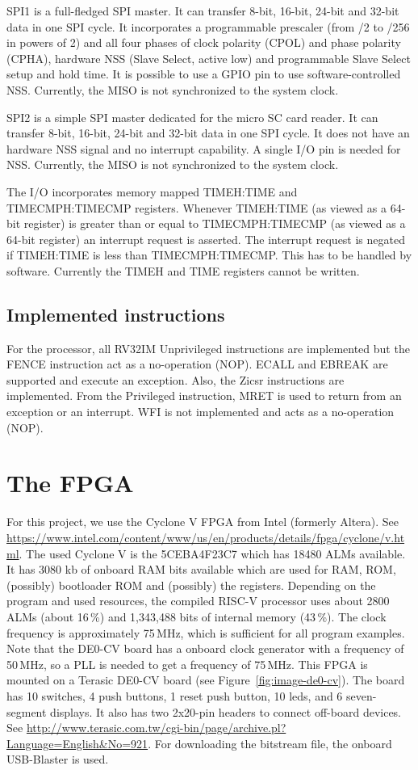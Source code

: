 \documentclass[12pt]{article}
\begin{document}
SPI1 is a full-fledged SPI master. It can transfer 8-bit, 16-bit, 24-bit and 32-bit data in one SPI cycle. It incorporates a programmable prescaler (from /2 to /256 in powers of 2) and all four phases of clock polarity (CPOL) and phase polarity (CPHA), hardware NSS (Slave Select, active low) and programmable Slave Select setup and hold time. It is possible to use a GPIO pin to use software-controlled NSS. Currently, the MISO is not synchronized to the system clock.

SPI2 is a simple SPI master dedicated for the micro SC card reader. It can transfer 8-bit, 16-bit, 24-bit and 32-bit data in one SPI cycle. It does not have an hardware NSS signal and no interrupt capability. A single I/O pin is needed for NSS. Currently, the MISO is not synchronized to the system clock.

The I/O incorporates memory mapped TIMEH:TIME and TIMECMPH:TIMECMP registers. Whenever TIMEH:TIME (as viewed as a 64-bit register) is greater than or equal to TIMECMPH:TIMECMP (as viewed as a 64-bit register) an interrupt request is asserted. The interrupt request is negated if TIMEH:TIME is less than TIMECMPH:TIMECMP. This has to be handled by software. Currently the TIMEH and TIME registers cannot be written.

\subsection{Implemented instructions}
For the processor, all RV32IM Unprivileged instructions are implemented but the FENCE instruction act as a no-operation (NOP). ECALL and EBREAK are supported and execute an exception. Also, the Zicsr instructions are implemented. From the Privileged instruction, MRET is used to return from an exception or an interrupt. WFI is not implemented and acts as a no-operation (NOP).

\section{The FPGA}
For this project, we use the Cyclone V FPGA from Intel (formerly Altera). See \url{https://www.intel.com/content/www/us/en/products/details/fpga/cyclone/v.html}.
The used Cyclone V is the 5CEBA4F23C7 which has 18480 ALMs available. It has 3080 kb of onboard RAM bits available which are used for RAM, ROM, (possibly) bootloader ROM and (possibly) the registers. Depending on the program and used resources, the compiled RISC-V processor uses about 2800 ALMs (about 16\,\%) and 1,343,488 bits of internal memory (43\,\%). The clock frequency is approximately 75\,MHz, which is sufficient for all program examples. Note that the DE0-CV board has a onboard clock generator with a frequency of 50\,MHz, so a PLL is needed to get a frequency of 75\,MHz. This FPGA is mounted on a Terasic DE0-CV board (see Figure~\ref{fig:image-de0-cv}). The board has 10 switches, 4 push buttons, 1 reset push button, 10 leds, and 6 seven-segment displays. It also has two 2x20-pin headers to connect off-board devices. See \url{http://www.terasic.com.tw/cgi-bin/page/archive.pl?Language=English&No=921}. For downloading the bitstream file, the onboard USB-Blaster is used.
\end{document}
